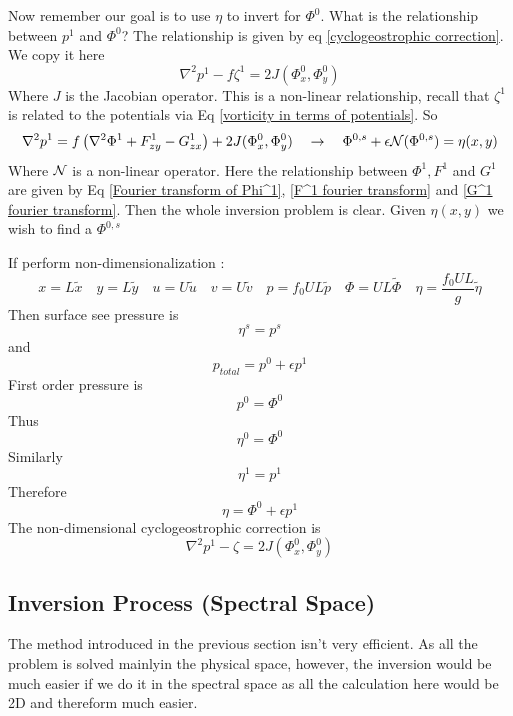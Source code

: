 \documentclass[../SQG_notes.tex]{subfiles}
\begin{document}
Now remember our goal is to use $\eta$ to invert for $\Phi^0$. What is the relationship between $p^1$ and $\Phi^0$? The relationship is given by eq \ref{cyclogeostrophic correction}. We copy it here 
\[
\boxed{\nabla^2 p^1 - f\zeta^1 = 2J(\Phi_x^0, \Phi_y^0)}
\]
Where $J$ is the Jacobian operator. This is a non-linear relationship, recall that $\zeta^1$ is related to the potentials via Eq \ref{vorticity in terms of potentials}. So 
\[
\nabla^2 p^1 = f\left(\nabla^2\Phi^1 + F_{zy}^1 - G_{zx}^1\right) + 2J(\Phi_x^0, \Phi_y^0) \quad \rightarrow \quad \Phi^{0,s} + \epsilon \mathcal{N}(\Phi^{0,s}) = \eta(x,y)
\]
Where $\mathcal{N}$ is a non-linear operator. Here the relationship between $\Phi^1, F^1$ and $G^1$ are given by Eq \ref{Fourier transform of Phi^1}, \ref{F^1 fourier transform} and \ref{G^1 fourier transform}. Then the whole inversion problem is clear. Given $\eta(x,y)$ we wish to find a $\Phi^{0,s}$ 
\begin{explanation}
    If perform non-dimensionalization : 
    \scriptsize
    \[x = L \tilde{x} \quad y = L \tilde{y} \quad u = U \tilde{u} \quad v = U \tilde{v} \quad p = f_0 U L \tilde{p} \quad \Phi = UL \tilde{\Phi} \quad \eta = \frac{f_0 UL}{g} \tilde{\eta}\]
    Then surface see pressure is  
    \[ \eta^s = p^s\]
    and 
    \[ p_{total} = p^0 + \epsilon p^1\]
    First order pressure is 
    \[ p^0 = \Phi^0\]
    Thus 
    \[ \eta^0 = \Phi^0\]
    Similarly 
    \[ \eta^1 = p^1\]
    Therefore 
    \[ \eta = \Phi^0 + \epsilon p^1\]
    The non-dimensional cyclogeostrophic correction is 
    \[ \nabla^2 p^1 - \zeta = 2J(\Phi_x^0, \Phi_y^0)\]
\end{explanation}

\subsection{Inversion Process (Spectral Space)}

The method introduced in the previous section isn't very efficient. As all the problem is solved mainlyin the physical space, however, the inversion would be much easier if we do it in the spectral space as all the calculation here would be 2D and thereform much easier. \par
\end{document}

